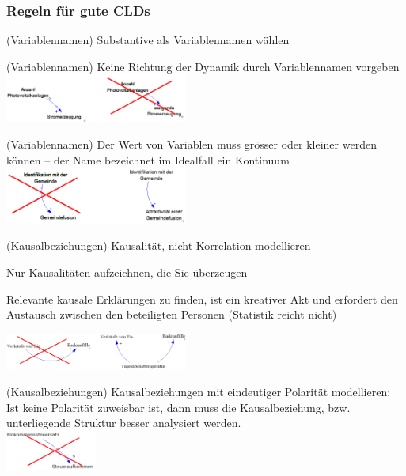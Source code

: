 \newpage

\subsubsection{Regeln für gute CLDs}
\begin{multicols}{2}
	\begin{compactenum}
		\item (Variablennamen) Substantive als Variablennamen wählen
		\item (Variablennamen) Keine Richtung der Dynamik durch Variablennamen vorgeben \\
		\includegraphics[width=0.45\textwidth]{pictures/regel_2}
		\item (Variablennamen) Der Wert von Variablen muss grösser oder kleiner werden können – der Name bezeichnet im Idealfall ein Kontinuum \\
		\includegraphics[width=0.45\textwidth]{pictures/regel_3}
		\item (Kausalbeziehungen) Kausalität, nicht Korrelation modellieren
		\begin{compactitem}
			\item Nur Kausalitäten aufzeichnen, die Sie überzeugen
			\item Relevante kausale Erklärungen zu finden, ist ein kreativer Akt und erfordert den Austausch zwischen den beteiligten Personen (Statistik	reicht nicht)
		\end{compactitem}
		\includegraphics[width=0.45\textwidth]{pictures/regel_4}
		\item (Kausalbeziehungen) Kausalbeziehungen mit eindeutiger Polarität modellieren: Ist keine Polarität zuweisbar ist, dann muss die	Kausalbeziehung, bzw. unterliegende Struktur besser	analysiert werden. \\
		\includegraphics[width=0.225\textwidth]{pictures/regel_5} 

\end{compactenum}
\end{multicols}
